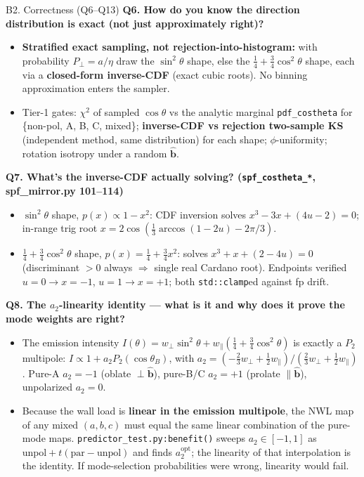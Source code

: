 \documentclass[11pt,aspectratio=169]{beamer}
\newcommand{\bhat}{\hat{\mathbf{b}}}
\newcommand{\qitem}[1]{\medskip\textbf{#1}\par}
\begin{document}
\begin{frame}[allowframebreaks]{B2. Correctness (Q6--Q13)}
\small
\qitem{Q6. How do you know the direction distribution is exact (not just approximately right)?}
\begin{itemize}
\item \textbf{Stratified exact sampling, not rejection-into-histogram:} with probability
      $P_\perp = a/\eta$ draw the $\sin^2\theta$ shape, else the
      $\tfrac14 + \tfrac34\cos^2\theta$ shape, each via a \textbf{closed-form inverse-CDF}
      (exact cubic roots). No binning approximation enters the sampler.
\item Tier-1 gates: $\chi^2$ of sampled $\cos\theta$ vs the analytic marginal
      \texttt{pdf\_costheta} for \{non-pol, A, B, C, mixed\}; \textbf{inverse-CDF vs rejection
      two-sample KS} (independent method, same distribution) for each shape; $\phi$-uniformity;
      rotation isotropy under a random $\bhat$.
\end{itemize}

\qitem{Q7. What's the inverse-CDF actually solving? (\texttt{spf\_costheta\_*}, spf\_mirror.py 101--114)}
\begin{itemize}
\item $\sin^2\theta$ shape, $p(x) \propto 1 - x^2$: CDF inversion solves
      $x^3 - 3x + (4u - 2) = 0$; in-range trig root
      $x = 2\cos(\tfrac13\arccos(1 - 2u) - 2\pi/3)$.
\item $\tfrac14 + \tfrac34\cos^2\theta$ shape, $p(x) = \tfrac14 + \tfrac34 x^2$: solves
      $x^3 + x + (2 - 4u) = 0$ (discriminant $> 0$ always $\Rightarrow$ single real Cardano
      root). Endpoints verified $u=0 \to x=-1$, $u=1 \to x=+1$; both \texttt{std::clamp}ed
      against fp drift.
\end{itemize}

\framebreak
\qitem{Q8. The $a_2$-linearity identity --- what is it and why does it prove the mode weights are right?}
\begin{itemize}
\item The emission intensity
      $I(\theta) = w_\perp \sin^2\theta + w_\parallel(\tfrac14 + \tfrac34\cos^2\theta)$ is
      exactly a $P_2$ multipole: $I \propto 1 + a_2 P_2(\cos\theta_B)$, with
      $a_2 = (-\tfrac23 w_\perp + \tfrac12 w_\parallel)/(\tfrac23 w_\perp + \tfrac12 w_\parallel)$.
      Pure-A $a_2 = -1$ (oblate $\perp \bhat$), pure-B/C $a_2 = +1$ (prolate $\parallel \bhat$),
      unpolarized $a_2 = 0$.
\item Because the wall load is \textbf{linear in the emission multipole}, the NWL map of any
      mixed $(a,b,c)$ must equal the same linear combination of the pure-mode maps.
      \texttt{predictor\_test.py:benefit()} sweeps $a_2 \in [-1,1]$ as
      $\text{unpol} + t(\text{par} - \text{unpol})$ and finds $a_2^{\text{opt}}$; the linearity
      of that interpolation is the identity. If mode-selection probabilities were wrong,
      linearity would fail.
\end{itemize}


\end{frame}
\end{document}
